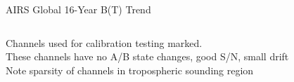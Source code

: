 \documentclass[10pt,t]{beamer}
\begin{document}
\begin{frame}[label={sec:org4503062}]{AIRS Global 16-Year B(T) Trend}
\begin{columns}
\begin{column}{0.55\columnwidth}
\begin{block}{\footnotesize}
\begin{footnotesize}
Channels used for calibration testing marked.\\
\vspace{0.05in}
These channels have no A/B state changes, good S/N, small drift\\
\vspace{0.05in}
Note sparsity of \cd channels in tropospheric sounding region\\
\end{footnotesize}
\end{block}
\end{column}
\end{columns}
\end{frame}
\end{document}
